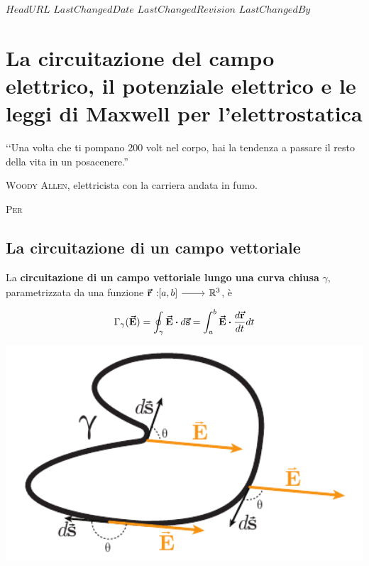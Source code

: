 \svnidlong
{$HeadURL$}
{$LastChangedDate$}
{$LastChangedRevision$}
{$LastChangedBy$}

\chapter{La circuitazione del campo elettrico, il potenziale elettrico e le leggi di Maxwell per l'elettrostatica} %
\begin{introduction}
	‘‘Una volta che ti pompano 200 volt nel corpo, hai la tendenza a passare il resto della vita in un posacenere.''
	\begin{flushright}
		\textsc{Woody Allen}, elettricista con la carriera andata in fumo.
	\end{flushright}
\end{introduction}
\lettrine[findent=1pt, nindent=0pt]{P}{er}  %
\section{La circuitazione di un campo vettoriale}
\begin{define}
	\begin{minipage}{0.65\textwidth}
		La \textbf{circuitazione di un campo vettoriale lungo una curva chiusa} $\gamma$, parametrizzata da una funzione $\funz[\vba{r}]{\left[a,b\right]}{\realset^3}$, è
		\begin{equation}
			\Gamma_{\gamma}(\vba{E})=\oint_{\gamma}\vba{E}\vdot d\vba{s}=\int_{a}^b\vba{E}\vdot\frac{d\vba{r}}{dt}dt
		\end{equation}
	\end{minipage}\hspace{5pt}
	\begin{minipage}{0.34\textwidth}
		\begin{center}
			\includegraphics[width=1\textwidth]{images/chp3circuitazione.pdf}
		\end{center}
	\end{minipage}
\end{define}
